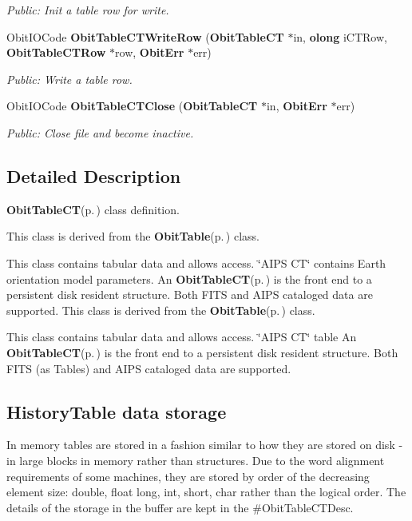 \begin{CompactItemize}
\begin{CompactList}\small\item\em Public: Init a table row for write. \item\end{CompactList}\item 
Obit\-IOCode {\bf Obit\-Table\-CTWrite\-Row} ({\bf Obit\-Table\-CT} $\ast$in, {\bf olong} i\-CTRow, {\bf Obit\-Table\-CTRow} $\ast$row, {\bf Obit\-Err} $\ast$err)
\begin{CompactList}\small\item\em Public: Write a table row. \item\end{CompactList}\item 
Obit\-IOCode {\bf Obit\-Table\-CTClose} ({\bf Obit\-Table\-CT} $\ast$in, {\bf Obit\-Err} $\ast$err)
\begin{CompactList}\small\item\em Public: Close file and become inactive. \item\end{CompactList}\end{CompactItemize}


\subsection{Detailed Description}
{\bf Obit\-Table\-CT}{\rm (p.\,\pageref{structObitTableCT})} class definition. 

This class is derived from the {\bf Obit\-Table}{\rm (p.\,\pageref{structObitTable})} class.

This class contains tabular data and allows access. \char`\"{}AIPS CT\char`\"{} contains Earth orientation model parameters. An {\bf Obit\-Table\-CT}{\rm (p.\,\pageref{structObitTableCT})} is the front end to a persistent disk resident structure. Both FITS and AIPS cataloged data are supported. This class is derived from the {\bf Obit\-Table}{\rm (p.\,\pageref{structObitTable})} class.

This class contains tabular data and allows access. \char`\"{}AIPS CT\char`\"{} table An {\bf Obit\-Table\-CT}{\rm (p.\,\pageref{structObitTableCT})} is the front end to a persistent disk resident structure. Both FITS (as Tables) and AIPS cataloged data are supported.\subsection{History\-Table data storage}\label{ObitTableWX_8h_TableDataStorage}
In memory tables are stored in a fashion similar to how they are stored on disk - in large blocks in memory rather than structures. Due to the word alignment requirements of some machines, they are stored by order of the decreasing element size: double, float long, int, short, char rather than the logical order. The details of the storage in the buffer are kept in the \#Obit\-Table\-CTDesc.


